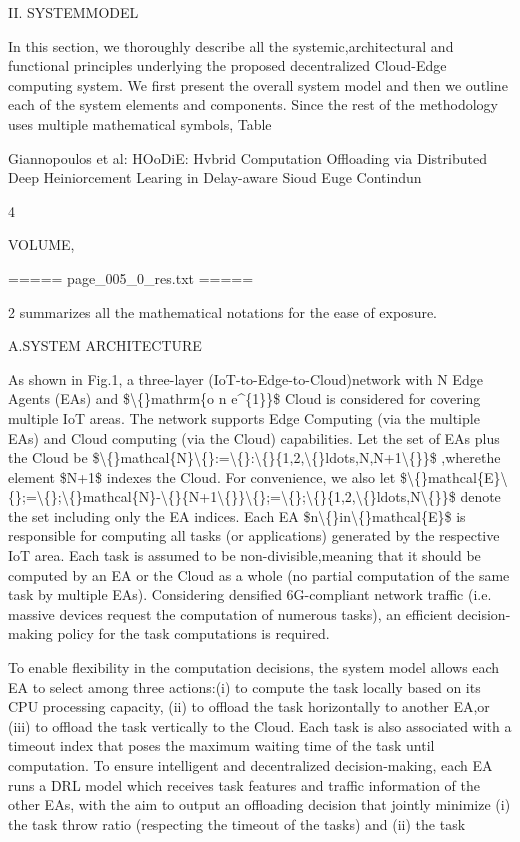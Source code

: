 \documentclass{article}
\begin{document}
II. SYSTEMMODEL

In this section, we thoroughly describe all the systemic,architectural and functional principles underlying the proposed decentralized Cloud-Edge computing system. We first present the overall system model and then we outline each of the system elements and components. Since the rest of the methodology uses multiple mathematical symbols, Table

Giannopoulos et al: HOoDiE: Hvbrid Computation Offloading via Distributed Deep Heiniorcement Learing in Delay-aware Sioud Euge Contindun

4

VOLUME,

===== page\_005\_0\_res.txt =====


2 summarizes all the mathematical notations for the ease of exposure.

A.SYSTEM ARCHITECTURE

As shown in Fig.1, a three-layer (IoT-to-Edge-to-Cloud)network with N Edge Agents (EAs) and \$\textbackslash\{\}mathrm\{o n e\textasciicircum{}\{1\}\}\$ Cloud is considered for covering multiple IoT areas. The network supports Edge Computing (via the multiple EAs) and Cloud computing (via the Cloud) capabilities. Let the set of EAs plus the Cloud be \$\textbackslash\{\}mathcal\{N\}\textbackslash\{\}:=\textbackslash\{\}:\textbackslash\{\}\{1,2,\textbackslash\{\}ldots,N,N+1\textbackslash\{\}\}\$ ,wherethe element \$N+1\$ indexes the Cloud. For convenience, we also let \$\textbackslash\{\}mathcal\{E\}\textbackslash\{\};=\textbackslash\{\};\textbackslash\{\}mathcal\{N\}-\textbackslash\{\}\{N+1\textbackslash\{\}\}\textbackslash\{\};=\textbackslash\{\};\textbackslash\{\}\{1,2,\textbackslash\{\}ldots,N\textbackslash\{\}\}\$ denote the set including only the EA indices. Each EA \$n\textbackslash\{\}in\textbackslash\{\}mathcal\{E\}\$ is responsible for computing all tasks (or applications) generated by the respective IoT area. Each task is assumed to be non-divisible,meaning that it should be computed by an EA or the Cloud as a whole (no partial computation of the same task by multiple EAs). Considering densified 6G-compliant network traffic (i.e. massive devices request the computation of numerous tasks), an efficient decision-making policy for the task computations is required.

To enable flexibility in the computation decisions, the system model allows each EA to select among three actions:(i) to compute the task locally based on its CPU processing capacity, (ii) to offload the task horizontally to another EA,or (iii) to offload the task vertically to the Cloud. Each task is also associated with a timeout index that poses the maximum waiting time of the task until computation. To ensure intelligent and decentralized decision-making, each EA runs a DRL model which receives task features and traffic information of the other EAs, with the aim to output an offloading decision that jointly minimize (i) the task throw ratio (respecting the timeout of the tasks) and (ii) the task
\end{document}

